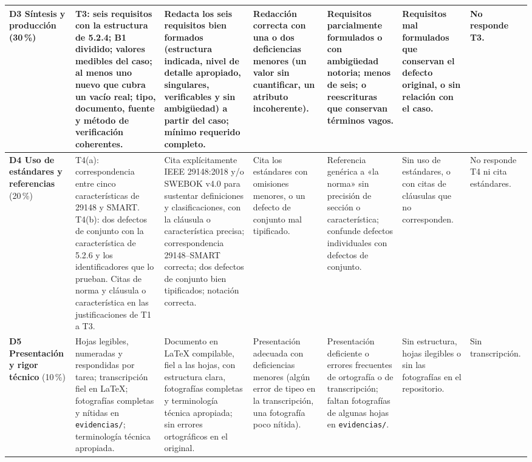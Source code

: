 \documentclass[11pt]{article}
\begin{document}
\begin{landscape}
{\begin{longtable}{|L{2.6cm}|L{4.3cm}|L{3.5cm}|L{3.2cm}|L{3.2cm}|L{3.0cm}|L{1.8cm}|}
			\hline
			\textbf{D3 Síntesis y producción} (30\,\%) & T3: seis requisitos con la estructura de 5.2.4; B1 dividido; valores medibles del caso; al menos uno nuevo que cubra un vacío real; tipo, documento, fuente y método de verificación coherentes. & Redacta los seis requisitos bien formados (estructura indicada, nivel de detalle apropiado, singulares, verificables y sin ambigüedad) a partir del caso; mínimo requerido completo. & Redacción correcta con una o dos deficiencias menores (un valor sin cuantificar, un atributo incoherente). & Requisitos parcialmente formulados o con ambigüedad notoria; menos de seis; o reescrituras que conservan términos vagos. & Requisitos mal formulados que conservan el defecto original, o sin relación con el caso. & No responde T3.\\
			\hline
			\textbf{D4 Uso de estándares y referencias} (20\,\%) & T4(a): correspondencia entre cinco características de 29148 y SMART. T4(b): dos defectos de conjunto con la característica de 5.2.6 y los identificadores que lo prueban. Citas de norma y cláusula o característica en las justificaciones de T1 a T3. & Cita explícitamente IEEE 29148:2018 y/o SWEBOK v4.0 para sustentar definiciones y clasificaciones, con la cláusula o característica precisa; correspondencia 29148--SMART correcta; dos defectos de conjunto bien tipificados; notación correcta. & Cita los estándares con omisiones menores, o un defecto de conjunto mal tipificado. & Referencia genérica a «la norma» sin precisión de sección o característica; confunde defectos individuales con defectos de conjunto. & Sin uso de estándares, o con citas de cláusulas que no corresponden. & No responde T4 ni cita estándares.\\
			\hline
			\textbf{D5 Presentación y rigor técnico} (10\,\%) & Hojas legibles, numeradas y respondidas por tarea; transcripción fiel en \LaTeX{}; fotografías completas y nítidas en \texttt{evidencias/}; terminología técnica apropiada. & Documento en \LaTeX{} compilable, fiel a las hojas, con estructura clara, fotografías completas y terminología técnica apropiada; sin errores ortográficos en el original. & Presentación adecuada con deficiencias menores (algún error de tipeo en la transcripción, una fotografía poco nítida). & Presentación deficiente o errores frecuentes de ortografía o de transcripción; faltan fotografías de algunas hojas en \texttt{evidencias/}. & Sin estructura, hojas ilegibles o sin las fotografías en el repositorio. & Sin transcripción.\\
			\hline
		\end{longtable}
	}
\end{landscape}
\end{document}
